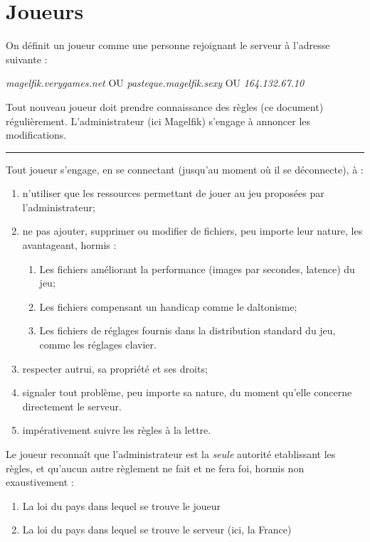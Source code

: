 \section{Joueurs}
\begin{flushleft}
	On d\'efinit un joueur comme une personne rejoignant le serveur \`a l'adresse suivante :
	\begin{center}
		\textit{magelfik.verygames.net}
		OU
		\textit{pasteque.magelfik.sexy}
		OU
		\textit{164.132.67.10}
	\end{center}
	Tout nouveau joueur doit prendre connaissance des r\`egles (ce document) r\'eguli\`erement. L'administrateur (ici Magelfik) s'engage \`a annoncer les modifications. \\
	\noindent\rule{\textwidth}{1pt}
	Tout joueur s'engage, en se connectant (jusqu'au moment o\`u il se d\'econnecte), \`a :
	\begin{enumerate}
		\item n'utiliser que les ressources permettant de jouer au jeu propos\'ees par l'administrateur;
		\item ne pas ajouter, supprimer ou modifier de fichiers, peu importe leur nature, les avantageant, hormis :
		\begin{enumerate}
			\item Les fichiers am\'eliorant la performance (images par secondes, latence) du jeu;
			\item Les fichiers compensant un handicap comme le daltonisme;
			\item Les fichiers de r\'eglages fournis dans la distribution standard du jeu, comme les r\'eglages clavier.
		\end{enumerate}
		\item respecter autrui, sa propri\'et\'e et ses droits;
		\item signaler tout probl\`eme, peu importe sa nature, du moment qu'elle concerne directement le serveur.
		\item imp\'erativement suivre les r\`egles \`a la lettre.
	\end{enumerate}
	Le joueur reconna\^it que l'administrateur est la \textit{seule} autorit\'e etablissant les r\`egles, et qu'aucun autre r\`eglement ne fait et ne fera foi, hormis non exaustivement :
	\begin{enumerate}
		\item La loi du pays dans lequel se trouve le joueur
		\item La loi du pays dans lequel se trouve le serveur (ici, la France)

\end{enumerate}
\end{flushleft}
